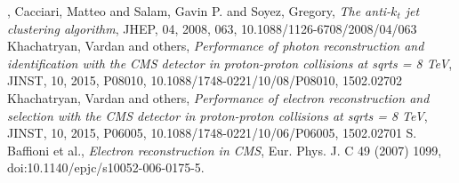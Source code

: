 \begin{thebibliography}{999}
		, Cacciari, Matteo and Salam, Gavin P. and Soyez, Gregory, \emph{The anti-$k_t$ jet clustering algorithm}, JHEP, 04, 2008, 063, 10.1088/1126-6708/2008/04/063
		 Khachatryan, Vardan and others, \emph{Performance of photon reconstruction and identification with the CMS detector in proton-proton collisions at sqrt{s} = 8 TeV}, JINST, 10,  2015, P08010, 10.1088/1748-0221/10/08/P08010, 1502.02702 
		 Khachatryan, Vardan and others, \emph{Performance of electron reconstruction and selection with the CMS detector in proton-proton collisions at sqrt{s} = 8 TeV}, JINST, 10, 2015, P06005, 10.1088/1748-0221/10/06/P06005, 1502.02701
		 S. Baffioni et al., \emph{Electron reconstruction in CMS}, Eur. Phys. J. C 49 (2007) 1099, doi:10.1140/epjc/s10052-006-0175-5.

	 \end{thebibliography}
\clearpage{\pagestyle{empty}\cleardoublepage}